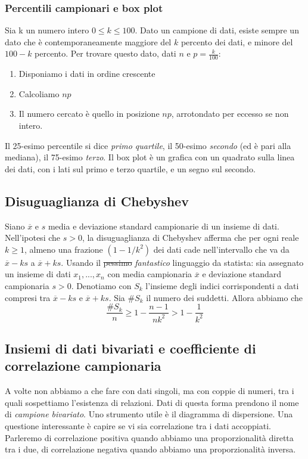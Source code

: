 \documentclass[11pt]{article}
\begin{document}
\subsubsection{Percentili campionari e box plot}
Sia k un numero intero $0\le k \le 100$. Dato un campione di dati, esiste sempre un dato che è contemporaneamente maggiore del $k$ percento dei dati, e minore del $100-k$ percento. Per trovare questo dato, dati $n$ e $p=\frac{k}{100}$:
\begin{enumerate}
    \item Disponiamo i dati in ordine crescente
    \item Calcoliamo $np$
    \item Il numero cercato è quello in posizione $np$, arrotondato per eccesso se non intero.
\end{enumerate}
Il 25-esimo percentile si dice \textit{primo quartile}, il 50-esimo \textit{secondo} (ed è pari alla mediana), il 75-esimo \textit{terzo}. Il box plot è un grafica con un quadrato sulla linea dei dati, con i lati sul primo e terzo quartile, e un segno sul secondo.
\subsection{Disuguaglianza di Chebyshev}
Siano $\overline{x}$ e $s$ media e deviazione standard campionarie di un insieme di dati. Nell'ipotesi che $s>0$, la disuguaglianza di Chebyshev afferma che per ogni reale $k\ge 1$, almeno una frazione $(1-1/k^2)$ dei dati cade nell'intervallo che va da $\overline{x}-ks$ a $\overline{x}+ks$.
Usando il \sout{pessimo} \textit{fantastico} linguaggio da statista: sia assegnato un insieme di dati $x_1,...,x_n$ con media campionaria $\overline{x}$ e deviazione standard campionaria $s>0$. Denotiamo con $S_k$ l'insieme degli indici corrispondenti a dati compresi tra $\overline{x}-ks$ e $\overline{x}+ks$. Sia $\#S_k$ il numero dei suddetti. Allora abbiamo che
\begin{displaymath}
\frac{\#S_k}{n}\ge 1 - \frac{n-1}{nk^2} >1-\frac{1}{k^2}
\end{displaymath}
\subsection{Insiemi di dati bivariati e coefficiente di correlazione campionaria}
A volte non abbiamo a che fare con dati singoli, ma con coppie di numeri, tra i quali sospettiamo l'esistenza di relazioni. Dati di questa forma prendono il nome di \textit{campione bivariato}. Uno strumento utile è il diagramma di dispersione. Una questione interessante è capire se vi sia correlazione tra i dati accoppiati. Parleremo di correlazione positiva quando abbiamo una proporzionalità diretta tra i due, di correlazione negativa quando abbiamo una proporzionalità inversa.
\end{document}
